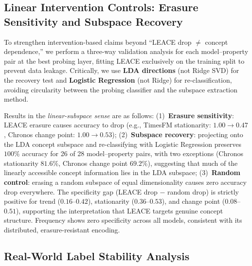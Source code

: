 \documentclass{article}
\begin{document}
\subsection{Linear Intervention Controls: Erasure Sensitivity and Subspace Recovery}
\label{sec:causal_controls}

To strengthen intervention-based claims beyond ``LEACE drop $\neq$ concept dependence,'' we perform a three-way validation analysis for each model--property pair at the best probing layer, fitting LEACE exclusively on the training split to prevent data leakage. Critically, we use \textbf{LDA directions} (not Ridge SVD) for the recovery test and \textbf{Logistic Regression} (not Ridge) for re-classification, avoiding circularity between the probing classifier and the subspace extraction method.

Results in the \emph{linear-subspace sense} are as follows: (1)~\textbf{Erasure sensitivity}: LEACE erasure causes accuracy to drop (e.g., TimesFM stationarity: $1.00 \to 0.47$, Chronos change point: $1.00 \to 0.53$); (2)~\textbf{Subspace recovery}: projecting onto the LDA concept subspace and re-classifying with Logistic Regression preserves $100\%$ accuracy for 26 of 28 model--property pairs, with two exceptions (Chronos stationarity $81.6\%$, Chronos change point $69.2\%$), suggesting that much of the linearly accessible concept information lies in the LDA subspace; (3)~\textbf{Random control}: erasing a random subspace of equal dimensionality causes zero accuracy drop everywhere. The specificity gap (LEACE drop $-$ random drop) is strictly positive for trend ($0.16$--$0.42$), stationarity ($0.36$--$0.53$), and change point ($0.08$--$0.51$), supporting the interpretation that LEACE targets genuine concept structure. Frequency shows zero specificity across all models, consistent with its distributed, erasure-resistant encoding.

\subsection{Real-World Label Stability Analysis}
\label{sec:label_stability}
\end{document}
